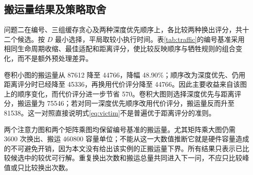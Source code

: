 \subsection{搬运量结果及策略取舍}
问题二在编号、三组缓存贪心及两种深度优先顺序上，各比较两种换出评分，共十二个候选。按 $D$ 最小选择，平局取较小执行时间。表\ref{tab:traffic}的编号基准采用相同生命周期收缩、最佳适配和距离评分，使比较反映顺序与牺牲规则的组合变化，而不是额外预处理差异。
\begin{table}[H]\centering\caption{问题二的额外搬运量与换出次数}\label{tab:traffic}\small
\end{table}

卷积小图的搬运量从 87612 降至 44766，降幅 48.90\%；顺序改为深度优先、仍用距离评分时已经降至 45336，再换用代价评分降至 44766。因此主要收益来自该图上的顺序变化，而代价评分进一步节省 570。卷积大图则选择深度优先与距离评分，搬运量为 75546；若对同一深度优先顺序改用代价评分，搬运量反而升至 81538。这一对照直接说明式\eqref{eq:victim}不是普遍优于距离评分的准则。

两个注意力图和两个矩阵乘图均保留编号基准的搬运量。尤其矩阵乘大图仍需 3600 次换出、搬运 460800 容量单位；不能从这一大数值推断它就是硬件容量造成的不可避免开销，因为本文没有给出该实例的正搬运量下界。所有结果只表示已比较候选中的较优可行解。重复换出次数和搬运总量共同进入下一问，不应只比较峰值或只比较换出次数。
